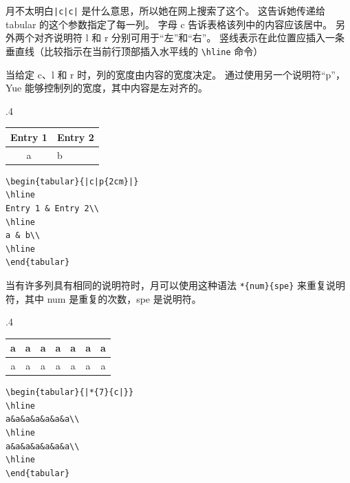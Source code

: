 月不太明白\verb=|c|c|= 是什么意思，所以她在网上搜索了这个。 这告诉她传递给 tabular 的这个参数指定了每一列。 字母 c 告诉表格该列中的内容应该居中。 另外两个对齐说明符 l 和 r 分别可用于“左”和“右”。 竖线表示在此位置应插入一条垂直线（比较指示在当前行顶部插入水平线的 \verb=\hline= 命令）

当给定 c、l 和 r 时，列的宽度由内容的宽度决定。 通过使用另一个说明符“p”，Yue 能够控制列的宽度，其中内容是左对齐的。
\begin{miniexammar}{.4\textandmarginlen}{
\begin{tabular}{|c|p{2cm}|}
\hline 
Entry 1 & Entry 2\\
\hline
a & b\\
\hline
\end{tabular}
}
\begin{lstlisting}
\begin{tabular}{|c|p{2cm}|}
\hline 
Entry 1 & Entry 2\\
\hline
a & b\\
\hline
\end{tabular}
\end{lstlisting}
\end{miniexammar}

当有许多列具有相同的说明符时，月可以使用这种语法 \verb=*{num}{spe}= 来重复说明符，其中 num 是重复的次数，spe 是说明符。
\begin{miniexammar}{.4\textandmarginlen}{
\begin{tabular}{|*{7}{c|}}
\hline 
a&a&a&a&a&a&a\\
\hline
a&a&a&a&a&a&a\\
\hline
\end{tabular}
}
\begin{lstlisting}
\begin{tabular}{|*{7}{c|}}
\hline 
a&a&a&a&a&a&a\\
\hline
a&a&a&a&a&a&a\\
\hline
\end{tabular}
\end{lstlisting}
\end{miniexammar}

